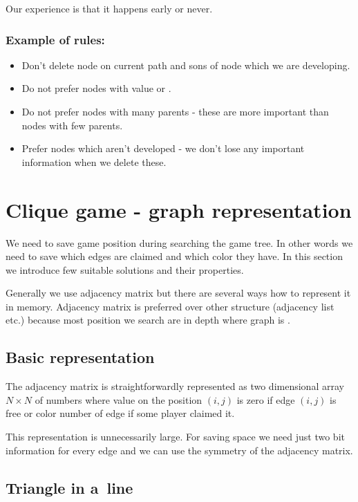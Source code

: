 Our experience is that it happens early or never.

\subsubsection{Example of rules: }
\begin{itemize}
\item Don't delete node on current path and sons of node which we are developing.
\item Do not prefer nodes with value \value{true} or \value{false}.
\item Do not prefer nodes with many parents - these are more important than nodes
      with few parents.
\item Prefer nodes which aren't developed - we don't lose any important information
      when we delete these. 
\end{itemize}

\section{Clique game - graph representation }

We need to save game position during searching the game tree. In other words we
need to save which edges are claimed and which color they have. In
this section we introduce few suitable solutions and their properties.

Generally we use adjacency matrix but there are several ways how to represent
it in memory. Adjacency matrix is preferred over other structure (adjacency list etc.) because
most position we search are in depth where graph is .

\subsection{Basic representation }
The adjacency matrix is straightforwardly represented as two 
dimensional array $N \times N$ of numbers where value on the position
$(i,j)$ is zero if edge $(i,j)$ is free or color number of edge if some player claimed it.

This representation is unnecessarily large. For saving space we need just two
bit information for every edge and we can use the symmetry of the adjacency
matrix. 

\subsection{Triangle in a~line }

